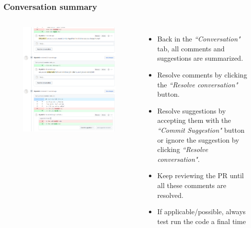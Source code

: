 \documentclass[aspectratio=169]{beamer} %
\begin{document}
\begin{frame}
	\frametitle{Conversation summary}
	\begin{columns}[c]
		
		\vspace{-.2cm}
		\begin{figure}
			\centering
			\includegraphics[width=\textwidth]{./img/conversation-summary.png}
		\end{figure}
		
		\begin{itemize}
			\setlength\itemsep{.7em}
			\item Back in the \textit{``Conversation"} tab, all comments and suggestions are summarized. 
			\item Resolve comments by clicking the \textit{``Resolve conversation"} button. \item Resolve suggestions by accepting them with the \textit{``Commit Suggestion"} button or ignore the suggestion by clicking \textit{``Resolve conversation"}.
			\item Keep reviewing the PR until all these comments are resolved.
			\item If applicable/possible, always test run the code a final time
		\end{itemize}
		
	\end{columns}
\end{frame}
\end{document}
